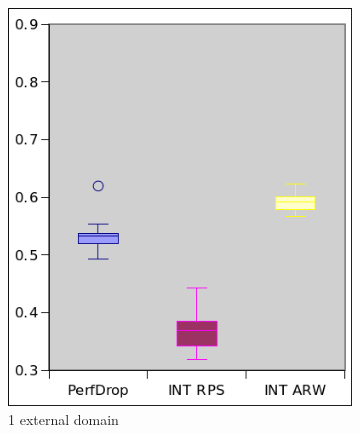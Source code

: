 \begin{figure}[!h]
        \centering
        \begin{subfigure}[b]{0.3\textwidth}
                \includegraphics[width=\textwidth]{images/stats2Guest.png}
                \caption{1 external domain}
  		\label{fig:box2}
        \end{subfigure}%
        \begin{subfigure}[b]{0.3\textwidth}

\end{subfigure}
\end{figure}
